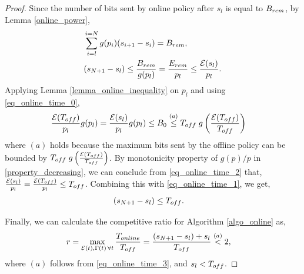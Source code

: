 \begin{proof}
Since the number of bits sent by online policy after ${s}_l$ is equal to $B_{\mbox{\scriptsize{rem}}}$, by Lemma \ref{online_power},
\begin{align}
&\sum_{i=l}^{i={N}}g(p_i)({s}_{i+1}-{s}_i)=B_{\mbox{\scriptsize{rem}}},
\\
&({s}_{{N}+1}-{s}_l)\le\frac{B_{\mbox{\scriptsize{rem}}}}{g(p_l)}=\frac{E_{\mbox{\scriptsize{rem}}}}{p_l}\le \frac{\ETx({s}_l)}{p_l}.
\label{eq_online_time_1}  
\end{align}
Applying Lemma \ref{lemma_online_inequality} on $p_l$ and using \eqref{eq_online_time_0},
\begin{align}
&\frac{\ETx(T_{\mbox{\scriptsize{off}}})}{p_l}g(p_l)=\frac{\ETx({s}_l)}{p_l}g(p_l)\le B_0\stackrel{(a)}{\le}T_{\mbox{\scriptsize{off}}}\; g\left(\frac{\ETx(T_{\mbox{\scriptsize{off}}})}{T_{\mbox{\scriptsize{off}}}}\right)
\label{eq_online_time_2}
\end{align}
where $(a)$ holds because the maximum bits sent by the offline policy can be bounded by $T_{\mbox{\scriptsize{off}}}\; g\left(\frac{\ETx(T_{\mbox{\scriptsize{off}}})}{T_{\mbox{\scriptsize{off}}}}\right)$. By monotonicity property of $g(p)/p$ in \eqref{property_decreasing}, we can conclude from \eqref{eq_online_time_2} that, $\frac{\ETx({s}_l)}{p_l}=\frac{\ETx(T_{\mbox{\scriptsize{off}}})}{p_l}\le T_{\mbox{\scriptsize{off}}}$. Combining this with \eqref{eq_online_time_1}, we get,
\begin{align}
&({s}_{{N}+1}-{s}_l)\le T_{\mbox{\scriptsize{off}}}.
\label{eq_online_time_3}
\end{align} 

Finally, we can calculate the competitive ratio for Algorithm \ref{algo_online} as,
\begin{align*}
&r=\displaystyle\max_{\ETx(t),\TRx(t)\hspace{0.5mm} \forall t}\dfrac{T_{\mbox{\scriptsize{online}}}}{T_{\mbox{\scriptsize{off}}}} = \dfrac{({s}_{{N}+1}-{s}_l)+{s}_l}{T_{\mbox{\scriptsize{off}}}} \stackrel{(a)}{<} 2,
\end{align*}
where $(a)$ follows from \eqref{eq_online_time_3}, and ${s}_l<T_{\mbox{\scriptsize{off}}}$.        
\end{proof}
